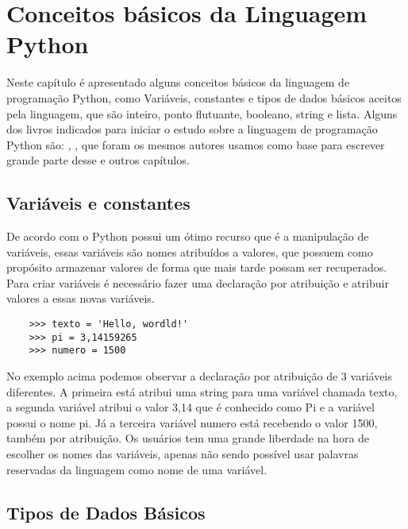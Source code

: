 

\chapter{ Conceitos básicos da Linguagem Python}

Neste capítulo é apresentado alguns conceitos básicos da linguagem de programação Python, como Variáveis, constantes e tipos de dados básicos aceitos pela linguagem, que são inteiro, ponto flutuante, booleano, string e lista. Alguns dos livros indicados para iniciar o estudo sobre a linguagem de programação Python são:  \cite{Lutz2007}, \cite{Perkovic2016}, que foram os mesmos autores usamos como base para escrever grande parte desse e outros capítulos.

    \section{Variáveis e constantes}
	De acordo com \cite{Severance2016} o Python possui um ótimo recurso que é a manipulação de variáveis, essas variáveis são nomes atribuídos a valores, que possuem como propósito armazenar valores de forma que mais tarde possam ser recuperados. 
	Para criar variáveis é necessário fazer uma declaração por atribuição e atribuir valores a essas novas variáveis. 
	\begin{lstlisting}
	>>> texto = 'Hello, wordld!'
	>>> pi = 3,14159265
	>>> numero = 1500
	\end{lstlisting}
	No exemplo acima podemos observar a declaração por atribuição de 3 variáveis diferentes. A primeira está atribui uma string para uma variável chamada texto, a segunda variável atribui o valor 3,14 que é conhecido como Pi e a variável possui o nome pi. Já a terceira variável numero está recebendo o valor 1500, também por atribuição. Os usuários tem uma grande liberdade na hora de escolher os nomes das variáveis, apenas não sendo possível usar palavras reservadas da linguagem como nome de uma variável.

    \section{Tipos de Dados B\'{a}sicos}

